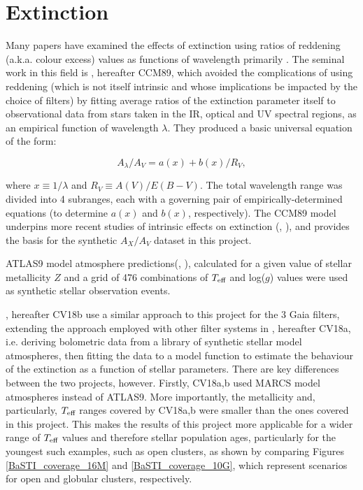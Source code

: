 \documentclass[12pt, a4paper]{report}
\begin{document}
\section{Extinction}
Many papers have examined the effects of extinction using ratios of reddening (a.k.a. colour excess) values as functions of wavelength primarily \citep{1988ApJ...328..734F}. The seminal work in this field is \cite{1989ApJ...345..245C}, hereafter CCM89, which avoided the complications of using reddening (which is not itself intrinsic and whose implications be impacted by the choice of filters) by fitting average ratios of the extinction parameter itself to observational data from stars taken in the IR, optical \citep{1988ESASP.281b.215C} and UV \citep{1988ApJ...328..734F} spectral regions, as an empirical function of wavelength $\lambda$. They produced a basic universal equation of the form:

\begin{equation}
A_{\lambda}/A_{V} = a(x) + b(x)/R_{V},
\label{CCM_general}
\end{equation}

where $x \equiv 1/\lambda$ and $R_{V} \equiv A(V)/E(B-V)$. The total wavelength range was divided into 4 subranges, each with a governing pair of empirically-determined equations (to determine $a(x)$ and $b(x)$, respectively). The CCM89 model underpins more recent studies of intrinsic effects on extinction (\cite{2008PASP..120..583G}, \cite{2018MNRAS.479L.102C}), and provides the basis for the synthetic $A_{X}/A_{V}$ dataset in this project.

ATLAS9 model atmosphere predictions(\cite{1997A&A...318..841C}, \cite{1993KurCD..13.....K}), calculated for a given value of stellar metallicity $Z$ and a grid of 476 combinations of $T_{\textnormal{eff}}$ and log($g$) values \citep{2004astro.ph..5087C} were used as synthetic stellar observation events.

\cite{2018MNRAS.479L.102C}, hereafter CV18b use a similar approach to this project for the 3 Gaia filters, extending the approach employed with other filter systems in \cite{2018MNRAS.475.5023C}, hereafter CV18a, i.e. deriving bolometric data from a library of synthetic stellar model atmospheres, then fitting the data to a model function to estimate the behaviour of the extinction as a function of stellar parameters. There are key differences between the two projects, however. Firstly, CV18a,b used MARCS model atmospheres instead of ATLAS9. More importantly, the metallicity and, particularly, $T_{\textnormal{eff}}$ ranges covered by CV18a,b were smaller than the ones covered in this project. This makes the results of this project more applicable for a wider range of $T_{\textnormal{eff}}$ values and therefore stellar population ages, particularly for the youngest such examples, such as open clusters, as shown by comparing Figures \ref{BaSTI_coverage_16M} and \ref{BaSTI_coverage_10G}, which represent scenarios for open and globular clusters, respectively.
\end{document}
